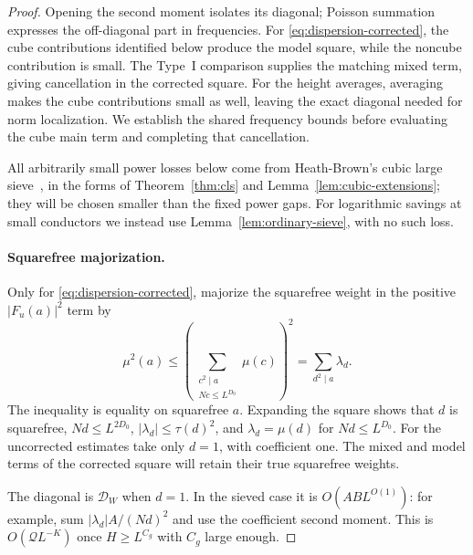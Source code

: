 \begin{proof}
Opening the second moment isolates its diagonal; Poisson summation
expresses the off-diagonal part in frequencies.
For \eqref{eq:dispersion-corrected}, the cube
contributions identified below produce the model square, while the
noncube contribution is small. The Type~I comparison supplies the
matching mixed term, giving cancellation in the corrected square.
For the height averages, averaging makes the cube contributions small
as well, leaving the exact diagonal needed for norm localization.
We establish the shared frequency bounds before evaluating the cube
main term and completing that cancellation.

All arbitrarily small power losses below come from Heath-Brown's cubic large
sieve~\cite{HB2000}, in the forms of
Theorem~\ref{thm:cls} and Lemma~\ref{lem:cubic-extensions}; they will be
chosen smaller than the fixed power gaps. For logarithmic savings at
small conductors we instead use Lemma~\ref{lem:ordinary-sieve}, with no
such loss.

\paragraph{Squarefree majorization.}
Only for \eqref{eq:dispersion-corrected}, majorize the squarefree weight
in the positive $|F_u(a)|^2$ term by
\begin{equation}
 \mu^2(a)\le
 \left(\sum_{\substack{c^2\mid a\\Nc\le L^{D_0}}}\mu(c)\right)^2
 =\sum_{d^2\mid a}\lambda_d.
 \label{eq:dispersion-sieve}
\end{equation}
The inequality is equality on squarefree $a$. Expanding the square shows
that $d$ is squarefree, $Nd\le L^{2D_0}$,
$|\lambda_d|\le\tau(d)^2$, and $\lambda_d=\mu(d)$ for $Nd\le L^{D_0}$.
For the uncorrected estimates take only $d=1$, with coefficient one.
The mixed and model terms of the corrected square will retain their
true squarefree weights.

The diagonal is $\mathcal D_W$ when $d=1$. In the sieved case it is
$O(AB L^{O(1)})$: for example, sum
$|\lambda_d|A/(Nd)^2$ and use the coefficient second moment. This is
$O(\mathcal Q L^{-K})$ once $H\ge L^{C_g}$ with $C_g$ large enough.


\end{proof}
